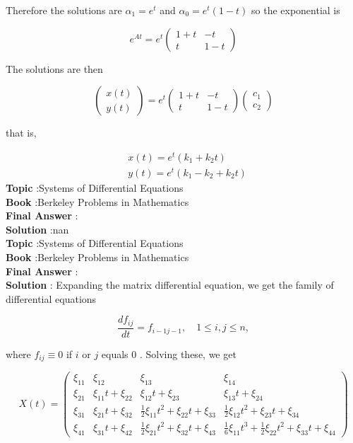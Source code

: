 \documentclass[10pt]{article}
\begin{document}
Therefore the solutions are $\alpha_{1}=e^{t}$ and $\alpha_{0}=e^{t}(1-t)$ so the exponential is

$$
e^{A t}=e^{t}\left(\begin{array}{cc}
1+t & -t \\
t & 1-t
\end{array}\right)
$$

The solutions are then

$$
\left(\begin{array}{l}
x(t) \\
y(t)
\end{array}\right)=e^{t}\left(\begin{array}{cc}
1+t & -t \\
t & 1-t
\end{array}\right)\left(\begin{array}{l}
c_{1} \\
c_{2}
\end{array}\right)
$$

that is,

$$
\begin{aligned}
&x(t)=e^{t}\left(k_{1}+k_{2} t\right) \\
&y(t)=e^{t}\left(k_{1}-k_{2}+k_{2} t\right)
\end{aligned}
$$
\textbf{Topic} :Systems of Differential Equations \\
\textbf{Book} :Berkeley Problems in Mathematics\\
\textbf{Final Answer} :\\


\textbf{Solution} :nan\\
\textbf{Topic} :Systems of Differential Equations \\
\textbf{Book} :Berkeley Problems in Mathematics\\
\textbf{Final Answer} :\\


\textbf{Solution} : Expanding the matrix differential equation, we get the family of differential equations

$$
\frac{d f_{i j}}{d t}=f_{i-1 j-1}, \quad 1 \leqslant i, j \leqslant n,
$$

where $f_{i j} \equiv 0$ if $i$ or $j$ equals 0 . Solving these, we get

$$
X(t)=\left(\begin{array}{cccc}
\xi_{11} & \xi_{12} & \xi_{13} & \xi_{14} \\
\xi_{21} & \xi_{11} t+\xi_{22} & \xi_{12} t+\xi_{23} & \xi_{13} t+\xi_{24} \\
\xi_{31} & \xi_{21} t+\xi_{32} & \frac{1}{2} \xi_{11} t^{2}+\xi_{22} t+\xi_{33} & \frac{1}{2} \xi_{12} t^{2}+\xi_{23} t+\xi_{34} \\
\xi_{41} & \xi_{31} t+\xi_{42} & \frac{1}{2} \xi_{21} t^{2}+\xi_{32} t+\xi_{43} & \frac{1}{6} \xi_{11} t^{3}+\frac{1}{2} \xi_{22} t^{2}+\xi_{33} t+\xi_{44}
\end{array}\right)
$$
\end{document}
